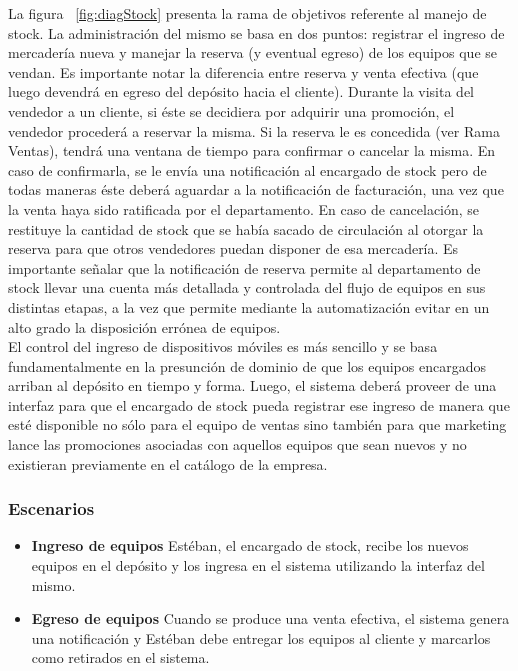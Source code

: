 La figura ~\ref{fig:diagStock} presenta la rama de objetivos referente al manejo de stock. La administración del mismo se basa en dos puntos: registrar el ingreso de mercadería nueva y manejar la reserva (y eventual egreso) de los equipos que se vendan. Es importante notar la diferencia entre reserva y venta efectiva (que luego devendrá en egreso del depósito hacia el cliente). Durante la visita del vendedor a un cliente, si éste se decidiera por adquirir una promoción, el vendedor procederá a reservar la misma. Si la reserva le es concedida (ver Rama Ventas), tendrá una ventana de tiempo para confirmar o cancelar la misma. En caso de confirmarla, se le envía una notificación al encargado de stock pero de todas maneras éste deberá aguardar a la notificación de facturación, una vez que la venta haya sido ratificada por el departamento. En caso de cancelación, se restituye la cantidad de stock que se había sacado de circulación al otorgar la reserva para que otros vendedores puedan disponer de esa mercadería. Es importante señalar que la notificación de reserva permite al departamento de stock llevar una cuenta más detallada y controlada del flujo de equipos en sus distintas etapas, a la vez que permite mediante la automatización evitar en un alto grado la disposición errónea de equipos. \\
\indent El control del ingreso de dispositivos móviles es más sencillo y se basa fundamentalmente en la presunción de dominio de que los equipos encargados arriban al depósito en tiempo y forma. Luego, el sistema deberá proveer de una interfaz para que el encargado de stock pueda registrar ese ingreso de manera que esté disponible no sólo para el equipo de ventas sino también para que marketing lance las promociones asociadas con aquellos equipos que sean nuevos y no existieran previamente en el catálogo de la empresa.

\subsubsection{Escenarios}

\begin{itemize}
  \item \textbf{Ingreso de equipos}
    Estéban, el encargado de stock, recibe los nuevos equipos en el depósito y los ingresa en el sistema utilizando la interfaz del mismo.
  \item \textbf{Egreso de equipos}
    Cuando se produce una venta efectiva, el sistema genera una notificación y Estéban debe entregar los equipos al cliente y marcarlos como retirados en el sistema.
\end{itemize}

